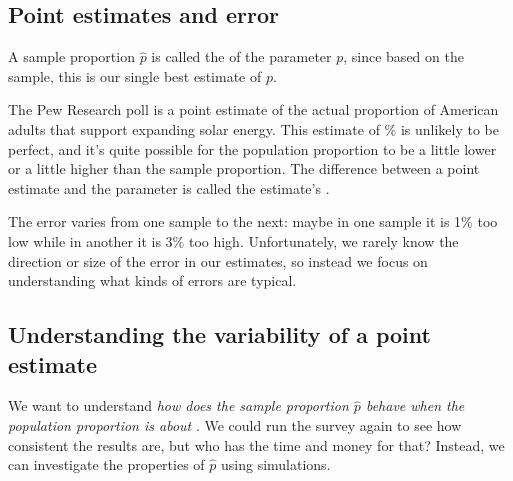 \subsection{Point estimates and error}


A sample proportion $\hat{p}$ is called
the  of the parameter $p$, since based
on the sample, this is our single best estimate of $p$.

The Pew Research poll is a point estimate
of the actual proportion
of American adults that support expanding solar energy.
This estimate of \pewsolarpollpercent{}\% is unlikely
to be perfect,
and it's quite possible for the population proportion
to be a little lower or a little higher than the
sample proportion.
The difference between a point estimate and
the parameter is called the estimate's .

The error varies from one sample to the next: maybe
in one sample it is 1\% too low while in another
it is 3\% too high. Unfortunately, we rarely know the direction
or size of the error in our estimates, so instead we focus
on understanding what kinds of errors are typical.


\subsection{Understanding the variability of a point estimate}
\label{simulationForUnderstandingVariabilitySection}

We want to understand \emph{how does the
sample proportion $\hat{p}$ behave when the population
proportion is about \pewsolarpollprop{}}. We could
run the survey again to see how consistent the results
are, but who has the time and money for that? Instead,
we can investigate the properties of $\hat{p}$ using simulations.


